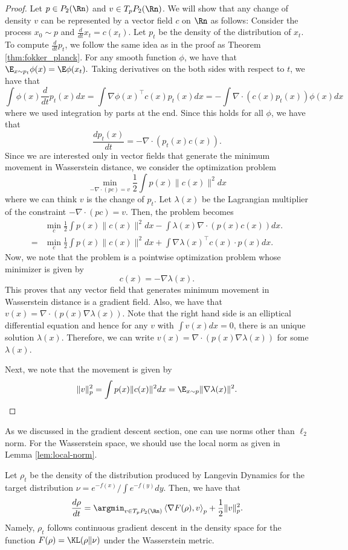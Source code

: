 \begin{proof}
Let $p\in P_{2}(\Rn)$ and $v\in T_{p}P_{2}(\Rn)$. We will show that
any change of density $v$ can be represented by a vector field $c$
on $\Rn$ as follows: Consider the process $x_{0}\sim p$ and $\frac{d}{dt}x_{t}=c(x_{t})$.
Let $p_{t}$ be the density of the distribution of $x_{t}$. To compute
$\frac{d}{dt}p_{t}$, we follow the same idea as in the proof as Theorem
\ref{thm:fokker_planck}. For any smooth function $\phi$, we have
that $\E_{x\sim p_{t}}\phi(x)=\E\phi(x_{t}).$ Taking derivatives
on the both sides with respect to $t$, we have that
\[
\int\phi(x)\frac{d}{dt}p_{t}(x)dx=\int\nabla\phi(x)^{\top}c(x)p_{t}(x)dx=-\int\nabla\cdot(c(x)p_{t}(x))\phi(x)dx
\]
where we used integration by parts at the end. Since this holds for
all $\phi$, we have that
\[
\frac{dp_{t}(x)}{dt}=-\nabla\cdot(p_{t}(x)c(x)).
\]
Since we are interested only in vector fields that generate the minimum
movement in Wasserstein distance, we consider the optimization problem
\[
\min_{-\nabla\cdot(pc)=v}\frac{1}{2}\int p(x)\|c(x)\|^{2}dx
\]
where we can think $v$ is the change of $p_{t}$. Let $\lambda(x)$
be the Lagrangian multiplier of the constraint $-\nabla\cdot(pc)=v$.
Then, the problem becomes
\begin{align*}
 & \min_{c}\frac{1}{2}\int p(x)\|c(x)\|^{2}dx-\int\lambda(x)\nabla\cdot(p(x)c(x))dx.\\
= & \min_{c}\frac{1}{2}\int p(x)\|c(x)\|^{2}dx+\int\nabla\lambda(x)^{\top}c(x)\cdot p(x)dx.
\end{align*}
Now, we note that the problem is a pointwise optimization problem
whose minimizer is given by
\[
c(x)=-\nabla\lambda(x).
\]
This proves that any vector field that generates minimum movement
in Wasserstein distance is a gradient field. Also, we have that $v(x)=\nabla\cdot(p(x)\nabla\lambda(x)).$
Note that the right hand side is an elliptical differential equation
and hence for any $v$ with $\int v(x)dx=0$, there is an unique solution
$\lambda(x)$. Therefore, we can write $v(x)=\nabla\cdot(p(x)\nabla\lambda(x))$
for some $\lambda(x)$.

Next, we note that the movement is given by
\[
\|v\|_{p}^{2}=\int p(x)\|c(x)\|^{2}dx=\E_{x\sim p}\|\nabla\lambda(x)\|^{2}.
\]
\end{proof}
As we discussed in the gradient descent section, one can use norms
other than $\ell_{2}$ norm. For the Wasserstein space, we should
use the local norm as given in Lemma \ref{lem:local-norm}.
\begin{thm}
\label{thm:LD_GD}Let $\rho_{t}$ be the density of the distribution
produced by Langevin Dynamics for the target distribution $\nu=e^{-f(x)}/\int e^{-f(y)}dy$.
Then, we have that
\[
\frac{d\rho}{dt}=\argmin_{v\in T_{p}P_{2}(\Rn)}\left\langle \nabla F(\rho),v\right\rangle _{p}+\frac{1}{2}\|v\|_{p}^{2}.
\]
Namely, $\rho_{t}$ follows continuous gradient descent in the density
space for the function $F(\rho)=\KL(\rho\|\nu)$ under the Wasserstein
metric.
\end{thm}

